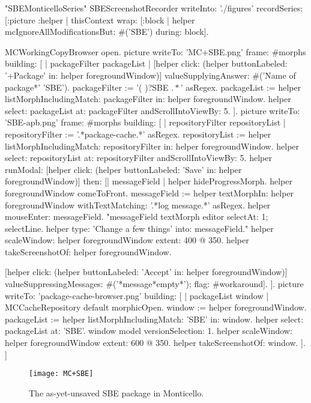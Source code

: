 \documentclass[a4paper,10pt,twoside]{book}
\begin{document}
\begin{ExecuteSmalltalkScript}
"SBEMonticelloSeries"
SBEScreenshotRecorder writeInto: './figures' recordSeries: [:picture :helper |
	thisContext wrap: [:block | helper mcIgnoreAllModificationsBut: #('SBE') during: block].
	
	MCWorkingCopyBrowser open.
	picture writeTo: 'MC+SBE.png' frame: #morphs building: [
		| packageFilter packageList |
		[helper click: (helper buttonLabeled: '+Package' in: helper foregroundWindow)]
			valueSupplyingAnswer: #('Name of package*' 'SBE').
		packageFilter := '(\* )?SBE \(.*\)' asRegex.
		packageList := helper listMorphIncludingMatch: packageFilter in: helper foregroundWindow.
		helper select: packageList at: packageFilter andScrollIntoViewBy: 5.
	].
	picture writeTo: 'SBE-apb.png' frame: #morphs building: [
		| repositoryFilter repositoryList |
		repositoryFilter := '.*package-cache.*' asRegex.
		repositoryList := helper listMorphIncludingMatch: repositoryFilter in: helper foregroundWindow.
		helper select: repositoryList at: repositoryFilter andScrollIntoViewBy: 5.
		helper
			runModal: [helper click: (helper buttonLabeled: 'Save' in: helper foregroundWindow)]
			then: [| messageField |
				helper hideProgressMorph.
				helper foregroundWindow comeToFront.
				messageField := helper textMorphIn: helper foregroundWindow withTextMatching: '.*log message.*' asRegex.
				helper mouseEnter: messageField.
				"messageField textMorph editor selectAt: 1; selectLine.
				helper type: 'Change a few things' into: messageField."
				helper scaleWindow: helper foregroundWindow extent: 400 @ 350.
				helper takeScreenshotOf: {helper foregroundWindow}.
				
				[helper click: (helper buttonLabeled: 'Accept' in: helper foregroundWindow)]
					valueSuppressingMessages: #('*message*empty*');
					flag: #workaround].
	].
	picture writeTo: 'package-cache-browser.png' building: [
		| packageList window |
		MCCacheRepository default morphicOpen.
		window := helper foregroundWindow.
		packageList := helper listMorphIncludingMatch: 'SBE' in: window.
		helper select: packageList at: 'SBE'.
		window model versionSelection: 1.
		helper scaleWindow: helper foregroundWindow extent: 600 @ 350.
		helper takeScreenshotOf: {window}.
	].
]
\end{ExecuteSmalltalkScript}
\begin{figure}[tbp]
	\begin{center}
		\texttt{[image: MC+SBE]}
	\end{center}
	\caption{The as-yet-unsaved SBE package in Monticello.}
	\label{fig:MC+SBE}
\end{figure}
\end{document}
